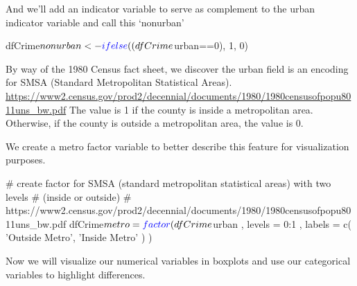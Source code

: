 \documentclass[]{article}
\newenvironment{Shaded}{}{}
\newcommand{\CommentTok}[1]{\textcolor[rgb]{0.00,0.50,0.00}{#1}}
\newcommand{\DataTypeTok}[1]{#1}
\newcommand{\DecValTok}[1]{#1}
\newcommand{\KeywordTok}[1]{\textcolor[rgb]{0.00,0.00,1.00}{#1}}
\newcommand{\NormalTok}[1]{#1}
\newcommand{\OperatorTok}[1]{#1}
\newcommand{\StringTok}[1]{\textcolor[rgb]{0.00,0.50,0.50}{#1}}
\begin{document}
And we'll add an indicator variable to serve as complement to the urban
indicator variable and call this `nonurban'

\begin{Shaded}
\begin{Highlighting}[]
\NormalTok{dfCrime}\OperatorTok{$}\NormalTok{nonurban <-}\StringTok{ }\KeywordTok{ifelse}\NormalTok{((dfCrime}\OperatorTok{$}\NormalTok{urban}\OperatorTok{==}\DecValTok{0}\NormalTok{), }\DecValTok{1}\NormalTok{, }\DecValTok{0}\NormalTok{)}
\end{Highlighting}
\end{Shaded}

By way of the 1980 Census fact sheet, we discover the urban field is an
encoding for SMSA (Standard Metropolitan Statistical Areas).
\url{https://www2.census.gov/prod2/decennial/documents/1980/1980censusofpopu8011uns_bw.pdf}
The value is 1 if the county is inside a metropolitan area. Otherwise,
if the county is outside a metropolitan area, the value is 0.

We create a metro factor variable to better describe this feature for
visualization purposes.

\begin{Shaded}
\begin{Highlighting}[]
\CommentTok{# create factor for SMSA (standard metropolitan statistical areas) with two levels}
\CommentTok{# (inside or outside)}
\CommentTok{#    https://www2.census.gov/prod2/decennial/documents/1980/1980censusofpopu8011uns_bw.pdf}
\NormalTok{dfCrime}\OperatorTok{$}\NormalTok{metro =}
\StringTok{            }\KeywordTok{factor}\NormalTok{( dfCrime}\OperatorTok{$}\NormalTok{urban , }\DataTypeTok{levels =} \DecValTok{0}\OperatorTok{:}\DecValTok{1}\NormalTok{ , }\DataTypeTok{labels =}
                    \KeywordTok{c}\NormalTok{( }\StringTok{'Outside Metro'}\NormalTok{,}
                       \StringTok{'Inside Metro'}
\NormalTok{                      )}
\NormalTok{                   )}
\end{Highlighting}
\end{Shaded}

Now we will visualize our numerical variables in boxplots and use our
categorical variables to highlight differences.
\end{document}
